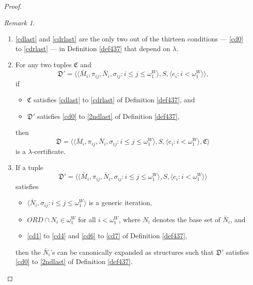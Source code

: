 \documentclass[12pt, twoside]{memoir}
\numberwithin{equation}{section}
\theoremstyle{definition}
\theoremstyle{remark}
\newtheorem{rem}[thm]{Remark}
\theoremstyle{definition}
\theoremstyle{definition}
\theoremstyle{definition}
\theoremstyle{remark}
\begin{document}
\begin{proof}
\begin{rem}\label{rem438}
\leavevmode
\begin{enumerate}[label=(\arabic*)]
    \item\label{dependl} \ref{cdlast} and \ref{cdrlast} are the only two out of the thirteen conditions --- \ref{cd0} to \ref{cdrlast} --- in Definition \ref{def437} that depend on $\lambda$.
    \item\label{4390} For any two tuples $\mathfrak{C}$ and
    \begin{equation*}
        \mathfrak{D}' = \langle \langle \bar{M}_i, \pi_{ij},  \bar{N}_i, \sigma_{ij} : i \leq j \leq \omega_1^{W} \rangle, S, \langle e_i : i < \omega_1^W \rangle \rangle \text{,}
    \end{equation*}
    if
    \begin{itemize}
        \item $\mathfrak{C}$ satisfies \ref{cdlast} to \ref{cdrlast} of Definition \ref{def437}, and
        \item $\mathfrak{D}'$ satisfies \ref{cd0} to \ref{2ndlast} of Definition \ref{def437},
    \end{itemize}
    then
    \begin{equation*}
        \mathfrak{D} = \langle \langle \bar{M}_i, \pi_{ij},  \bar{N}_i, \sigma_{ij} : i \leq j \leq \omega_1^{W} \rangle, S, \langle e_i : i < \omega_1^W \rangle, \mathfrak{C} \rangle
    \end{equation*}
    is a $\lambda$-certificate.
    \item\label{4391} If a tuple
    \begin{equation*}
        \mathfrak{D}' = \langle \langle \bar{M}_i, \pi_{ij},  \bar{N}_i, \sigma_{ij} : i \leq j \leq \omega_1^{W} \rangle, S, \langle e_i : i < \omega_1^W \rangle \rangle
    \end{equation*}
    satisfies 
    \begin{itemize}
        \item $\langle \bar{N}_i, \sigma_{ij} : i \leq  j \leq \omega_1^{W} \rangle$ is a generic iteration, 
        \item $ORD \cap N_i \in \omega_1^W$ for all $i < \omega_1^W$, where $N_i$ denotes the base set of $\bar{N}_i$, and
        \item \ref{cd1} to \ref{cd4} and \ref{cd6} to \ref{cd7} of Definition \ref{def437},
    \end{itemize}
    then the $\bar{N}_i$'s can be canonically expanded as structures such that $\mathfrak{D}'$ satisfies \ref{cd0} to \ref{2ndlast} of Definition \ref{def437}.

\end{enumerate}
\end{rem}
\end{proof}
\end{document}
